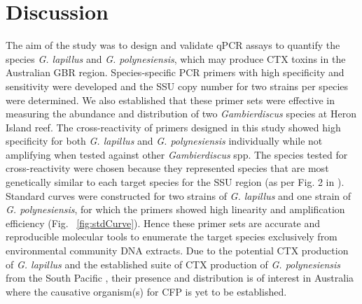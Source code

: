 \documentclass[12pt]{article}
\begin{document}
\section*{Discussion}
The aim of the study was to design and validate qPCR assays to quantify the species \emph{G. lapillus} and \emph{G. polynesiensis}, which may produce CTX toxins in the Australian GBR region. 
Species-specific PCR primers with high specificity and sensitivity were developed and the SSU copy number for two strains per species were determined. We also established that these primer sets were effective in measuring the abundance and distribution of two \emph{Gambierdiscus} species at Heron Island reef. The cross-reactivity of primers designed in this study showed high specificity for both \emph{G. lapillus} and \emph{G. polynesiensis} individually while not amplifying when tested against other \emph{Gambierdiscus} spp. The species tested for cross-reactivity were chosen because they represented species that are most genetically similar to each target species for the SSU region (as per Fig. 2 in \citep{kretzschmar2016characterization}).
Standard curves were constructed for two strains of \emph{G. lapillus} and one strain of \emph{G. polynesiensis}, for which the primers showed high linearity and amplification efficiency (Fig. ~\ref{fig:stdCurve}). Hence these primer sets are accurate and reproducible molecular tools to enumerate the target species exclusively from environmental community DNA extracts.
Due to the potential CTX production of \emph{G. lapillus} \citep{kretzschmar2016characterization} and the established suite of CTX production of \emph{G. polynesiensis} from the South Pacific \citep{chinain2010growth}, their presence and distribution is of interest in Australia where the causative organism(s) for CFP is yet to be established.\\

\end{document}
